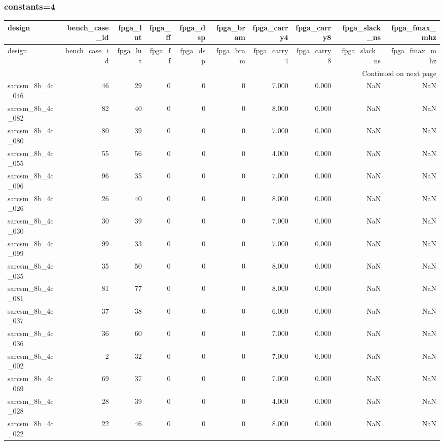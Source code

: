 \documentclass{article}
\begin{document}
\subsubsection*{constants=4}
\begin{longtable}{lrrrrrrrrr}
\toprule
design & bench\_case\_id & fpga\_lut & fpga\_ff & fpga\_dsp & fpga\_bram & fpga\_carry4 & fpga\_carry8 & fpga\_slack\_ns & fpga\_fmax\_mhz \\
\midrule
\endfirsthead
\toprule
design & bench\_case\_id & fpga\_lut & fpga\_ff & fpga\_dsp & fpga\_bram & fpga\_carry4 & fpga\_carry8 & fpga\_slack\_ns & fpga\_fmax\_mhz \\
\midrule
\endhead
\midrule
\multicolumn{10}{r}{Continued on next page} \\
\midrule
\endfoot
\bottomrule
\endlastfoot
sarcsm\_8b\_4c\_046 & 46 & 29 & 0 & 0 & 0 & 7.000 & 0.000 & NaN & NaN \\
sarcsm\_8b\_4c\_082 & 82 & 40 & 0 & 0 & 0 & 8.000 & 0.000 & NaN & NaN \\
sarcsm\_8b\_4c\_080 & 80 & 39 & 0 & 0 & 0 & 7.000 & 0.000 & NaN & NaN \\
sarcsm\_8b\_4c\_055 & 55 & 56 & 0 & 0 & 0 & 4.000 & 0.000 & NaN & NaN \\
sarcsm\_8b\_4c\_096 & 96 & 35 & 0 & 0 & 0 & 7.000 & 0.000 & NaN & NaN \\
sarcsm\_8b\_4c\_026 & 26 & 40 & 0 & 0 & 0 & 8.000 & 0.000 & NaN & NaN \\
sarcsm\_8b\_4c\_030 & 30 & 39 & 0 & 0 & 0 & 7.000 & 0.000 & NaN & NaN \\
sarcsm\_8b\_4c\_099 & 99 & 33 & 0 & 0 & 0 & 7.000 & 0.000 & NaN & NaN \\
sarcsm\_8b\_4c\_035 & 35 & 50 & 0 & 0 & 0 & 8.000 & 0.000 & NaN & NaN \\
sarcsm\_8b\_4c\_081 & 81 & 77 & 0 & 0 & 0 & 8.000 & 0.000 & NaN & NaN \\
sarcsm\_8b\_4c\_037 & 37 & 38 & 0 & 0 & 0 & 6.000 & 0.000 & NaN & NaN \\
sarcsm\_8b\_4c\_036 & 36 & 60 & 0 & 0 & 0 & 7.000 & 0.000 & NaN & NaN \\
sarcsm\_8b\_4c\_002 & 2 & 32 & 0 & 0 & 0 & 7.000 & 0.000 & NaN & NaN \\
sarcsm\_8b\_4c\_069 & 69 & 37 & 0 & 0 & 0 & 7.000 & 0.000 & NaN & NaN \\
sarcsm\_8b\_4c\_028 & 28 & 39 & 0 & 0 & 0 & 4.000 & 0.000 & NaN & NaN \\
sarcsm\_8b\_4c\_022 & 22 & 46 & 0 & 0 & 0 & 8.000 & 0.000 & NaN & NaN \\

\end{longtable}
\end{document}
